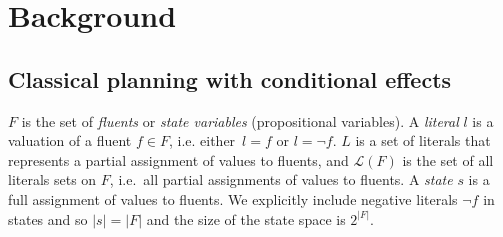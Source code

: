 \documentclass[letterpaper]{article} %
\newcommand{\tup}[1]{{\langle #1 \rangle}}
\newcommand{\pre}{\mathsf{pre}}     %
\newcommand{\eff}{\mathsf{eff}}     %
\begin{document}
\section{Background}
\label{sec:background}

\subsection{Classical planning with conditional effects}
$F$ is the set of {\em fluents} or {\em state variables} (propositional variables). A {\em literal} $l$ is a valuation of a fluent $f\in F$, i.e. either~$l=f$ or $l=\neg f$. $L$ is a set of literals that represents a partial assignment of values to fluents, and $\mathcal{L}(F)$ is the set of all literals sets on $F$, i.e.~all partial assignments of values to fluents. A {\em state} $s$ is a full assignment of values to fluents. We explicitly include negative literals $\neg f$ in states and so $|s|=|F|$ and the size of the state space is $2^{|F|}$.


\end{document}
